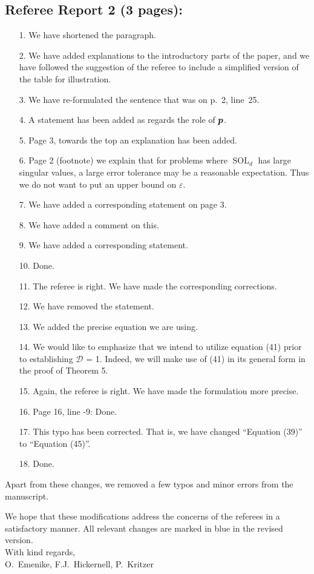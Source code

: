 \documentclass[11pt,a4paper]{article}
\newcommand{\thed}{\mathscr{D}}
\DeclareMathOperator{\SOL}{SOL}
\begin{document}
\subsection*{Referee Report 2 (3 pages):}
\begin{itemize}
    \item[1.] We have shortened the paragraph. 
    \item[2.] We have added explanations to the introductory parts of the paper, and we have followed the suggestion of the referee to include a simplified version of the table for illustration. 
    \item[3.] We have re-formulated the sentence that was on p.~2, line~25. 
    \item[4.] A statement has been added as regards the role of $\boldsymbol{p}$.
    \item[5.] Page 3, towards the top an explanation has been added.
    \item[6.] Page 2 (footnote) we explain that for problems where $\SOL_d$ has large singular values, a large error tolerance may be a reasonable expectation.  Thus we do not want to put an upper bound on $\varepsilon$.
    \item[7.] We have added a corresponding statement on page 3. 
    \item[8.] We have added a comment on this. 
    \item[9.] We have added a corresponding statement. 
    \item[10.] Done. 
    \item[11.] The referee is right. We have made the corresponding corrections. 
    \item[12.] We have removed the statement. 
    \item[13.] We added the precise equation we are using.
    \item[14.] We would like to emphasize that we intend to utilize equation (41) prior to establishing $\thed$ = 1. Indeed, we will make use of (41) in its general form in the proof of Theorem 5. 
    \item[15.] Again, the referee is right. We have made the formulation more precise. 
    \item[16.] Page 16, line -9: Done.
    \item[17.] This typo has been corrected. That is, we have changed ``Equation (39)'' to ``Equation (45)''.
    \item[18.] Done.
\end{itemize}

\bigskip

Apart from these changes, we removed a few typos and minor errors from the manuscript.

\medskip

We hope that these modifications address the concerns of the referees in a satisfactory manner. 
All relevant changes are marked in blue in the revised version.\\

\noindent With kind regards,\\[0.25cm]

\noindent O.~Emenike, F.J.~Hickernell, P.~Kritzer
\end{document}

